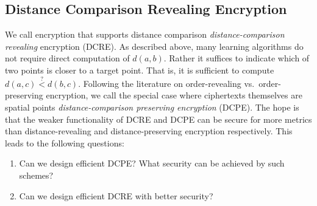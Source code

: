 \subsection{Distance Comparison Revealing Encryption}
We call encryption that supports distance comparison \emph{distance-comparison revealing} encryption (DCRE).  As described above, many learning algorithms do not require direct computation of $d(a,b)$.  Rather it suffices to indicate which of two points is closer to a target point.  That is, it is sufficient to compute $d(a,c)\overset{?}<d(b,c)$.  Following the literature on order-revealing vs.~order-preserving encryption, we call the special case where ciphertexts themselves are spatial points \emph{distance-comparison preserving encryption} (DCPE).  The hope is that the weaker functionality of DCRE and DCPE can be secure for more metrics than distance-revealing and distance-preserving encryption respectively.
This leads to the following questions:

\begin{enumerate}\setlength{\itemsep}{0ex}
\item Can we design efficient DCPE?  What security can be achieved by such schemes?
\item Can we design efficient DCRE with better security?
\end{enumerate}

